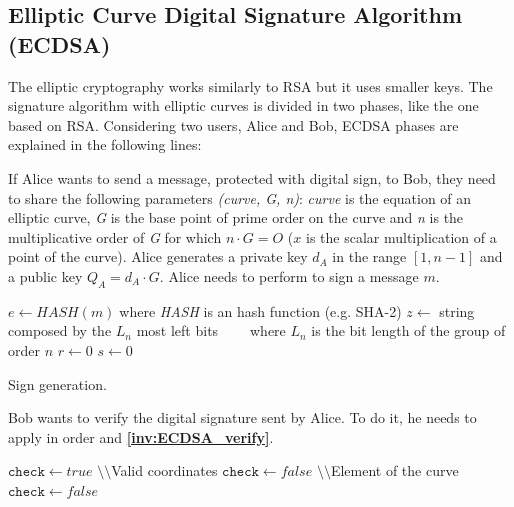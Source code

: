 \subsection{Elliptic Curve Digital Signature Algorithm (ECDSA)}
The elliptic cryptography works similarly to RSA but it uses smaller keys. The signature algorithm with elliptic curves is divided in two phases, like the one based on RSA. Considering two users, Alice and Bob, ECDSA phases are explained in the following lines:
\begin{itemize}
{If Alice wants to send a message, protected with digital sign, to Bob, they need to share the following parameters \textit{(curve, G, n)}: \textit{curve} is the equation of an elliptic curve, \textit{G} is the base point of prime order on the curve and \textit{n} is the multiplicative order of \textit{G} for which $n\cdot G = O$ ($x$ is the scalar multiplication of a point of the curve).
Alice generates a private key $d_A$ in the range $[1, n-1]$ and a public key $Q_A=d_A\cdot G$. Alice needs to perform  to sign a message $m$.
\begin{algorithm}[h]
\DontPrintSemicolon\footnotesize
{}
\BlankLine
$e\gets HASH(m)\;$where \textit{HASH} is an hash function (e.g. SHA-2)\;
\BlankLine
$z \gets$ string composed by the $L_n$ most left bits\;
$\;\;\;\;\;\;\;$where $L_n$ is the bit length of the group of order $n$\;
$r\gets 0$\;
$s\gets 0$\;
\BlankLine
{}
\caption{Sign generation.}\label{inv:ECDSA_sign}
\end{algorithm}
}
{Bob wants to verify the digital signature sent by Alice. To do it, he needs to apply in order  and \textbf{\ref{inv:ECDSA_verify}}.\\
\begin{algorithm}[h]
\DontPrintSemicolon\footnotesize
{}
\BlankLine
$\mathtt{check}\gets true$\;
\BlankLine
$\setminus\setminus$Valid coordinates\;
{	
$\mathtt{check}\gets false$\;
}
\BlankLine
$\setminus\setminus$Element of the curve\;
{	
$\mathtt{check}\gets false$\;
}
\end{algorithm}}
\end{itemize}
